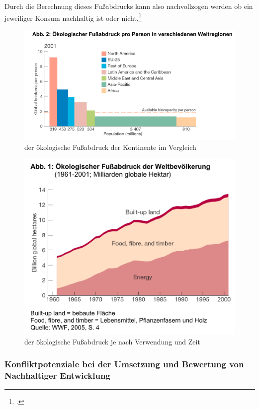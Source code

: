 \documentclass{scrartcl}
\begin{document}
Durch die Berechnung dieses Fußabdrucks kann also nachvollzogen werden ob ein jeweiliger Konsum nachhaltig ist oder nicht.\footcite[S.192]{AntjeFlade2015StadtStadtforschung}

\begin{figure}[htbp]
\centering
\includegraphics[width=12cm]{image_folder/oekFussabdruckWelt.png}
\caption{der ökologische Fußabdruck der Kontinente im Vergleich}
\label{fig:oekFussabdruckWelt}
\end{figure}

\begin{figure}[htbp]
\centering
\includegraphics[width=12cm]{image_folder/oekFussabdruckZeit.png}
\caption{der ökologische Fußabdruck je nach Verwendung und Zeit}
\label{fig: oekFussabdruckZeit}
\end{figure}

\subsubsection{Konfliktpotenziale bei der Umsetzung und Bewertung von Nachhaltiger Entwicklung}
\end{document}
